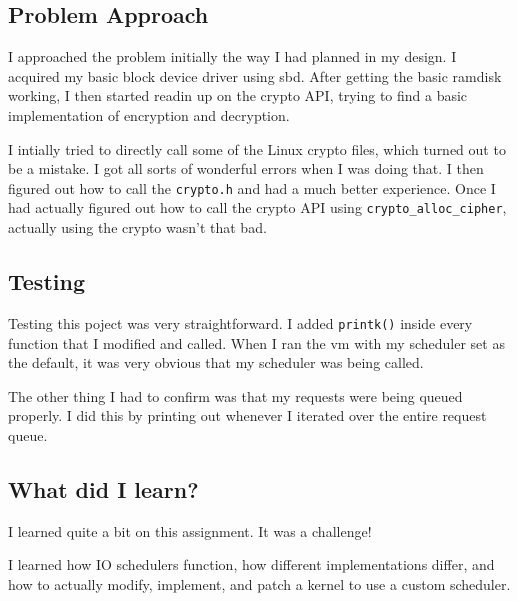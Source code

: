 \documentclass[10pt,letterpaper,onecolumn,draftclsnofoot]{IEEEtran}
\begin{document}
	\subsection{Problem Approach}
	I approached the problem initially the way I had planned in my design. I 
	acquired my basic block device driver using sbd. After getting the basic
	ramdisk working, I then started readin up on the crypto API, trying to find
	a basic implementation of encryption and decryption.

	I intially tried to directly call some of the Linux crypto files, which turned
	out to be a mistake. I got all sorts of wonderful errors when I was doing that.
	I then figured out how to call the \texttt{crypto.h} and had a much better experience.
	Once I had actually figured out how to call the crypto API using \texttt{crypto\_alloc\_cipher},
	actually using the crypto wasn't that bad.
	
	\subsection{Testing}
	Testing this poject was very straightforward. I added \texttt{printk()} inside
	every function that I modified and called. When I ran the vm with my scheduler
	set as the default, it was very obvious that my scheduler was being called.

	The other thing I had to confirm was that my requests were being queued properly.
	I did this by printing out whenever I iterated over the entire request queue.

	\subsection{What did I learn?}
	I learned quite a bit on this assignment. It was a challenge!

	I learned how IO schedulers function, how different implementations differ,
	and how to actually modify, implement, and patch a kernel to use a custom
	scheduler.
\end{document}
